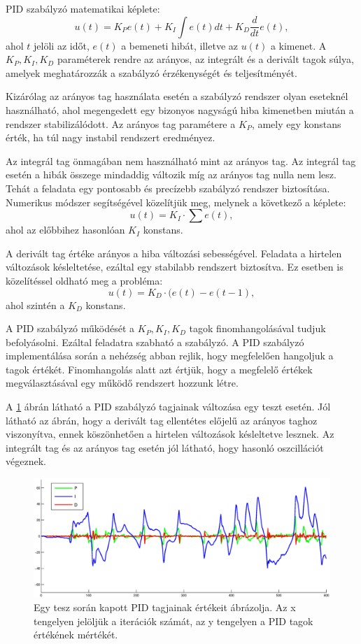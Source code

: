 PID szabályzó matematikai képlete: $$u(t)=K_{P}e(t)+K_{I}\int e(t)dt+K_{D}\frac{d}{dt}e(t),$$ ahol $t$ jelöli az időt, $e(t)$ a bemeneti hibát, illetve az $u(t)$ a kimenet. A $K_{P}, K_{I}, K_{D}$ paraméterek rendre az arányos, az integrált és a derivált tagok súlya, amelyek meghatározzák a szabályzó érzékenységét és teljesítményét.

Kizárólag az arányos tag használata esetén a szabályzó rendszer olyan eseteknél használható, ahol megengedett egy bizonyos nagyságú hiba kimenetben miután a rendszer stabilizálódott. Az arányos tag paramétere a $K_{P}$, amely egy konstans érték, ha túl nagy instabil rendszert eredményez.

Az integrál tag önmagában nem használható mint az arányos tag. Az integrál tag esetén a hibák összege mindaddig változik míg az arányos tag nulla nem lesz. Tehát a feladata egy pontosabb és precízebb szabályzó rendszer biztosítása. Numerikus módszer segítségével közelítjük meg, melynek a következő a képlete:$$u(t)=K_{I}\cdot\sum e(t),$$ ahol az előbbihez hasonlóan $K_{I}$ konstans.

A derivált tag értéke arányos a hiba változási sebességével. Feladata a hirtelen változások késleltetése, ezáltal egy stabilabb rendszert biztosítva. Ez esetben is közelítéssel oldható meg a probléma:$$u(t)=K_{D}\cdot (e(t) - e(t-1),$$ ahol szintén a $K_{D}$ konstans.

A PID szabályzó működését a $K_{P}, K_{I}, K_{D}$ tagok finomhangolásával tudjuk befolyásolni. Ezáltal feladatra szabható a szabályzó.  A PID szabályzó implementálása során a nehézség abban rejlik, hogy megfelelően hangoljuk a tagok értékét. Finomhangolás alatt azt értjük, hogy a megfelelő értékek megválasztásával egy működő rendszert hozzunk létre.

A \ref{pidFig} ábrán látható a PID szabályzó tagjainak változása egy teszt esetén. Jól látható az ábrán, hogy a derivált tag ellentétes előjelű az arányos taghoz viszonyítva, ennek köszönhetően a hirtelen változások késleltetve lesznek. Az integrált tag és az arányos tag esetén jól látható, hogy hasonló oszcillációt végeznek.



\begin{figure}[h]
	\centering
	\includegraphics[width=1\linewidth]{images/pid.eps}
	\captionsetup{justification=centering,margin=1.5cm}
	\caption[Egy tesz során kapott PID tagjainak értékeit ábrázolja]
	{Egy tesz során kapott PID tagjainak értékeit ábrázolja. Az x tengelyen jelöljük a iterációk számát,	az y tengelyen a PID tagok értékének mértékét.}
	\label{pidFig}
\end{figure}
